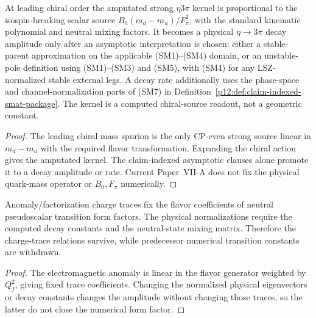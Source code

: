 \documentclass[12pt,a4paper]{article}
\begin{document}
\begin{corollary}
\label{p11:cor:native-eta-to-three-pi-source}

At leading chiral order the amputated strong \(\eta3\pi\) kernel is
proportional to the isospin-breaking scalar source
\(B_0(m_d-m_u)/F_\pi^2\), with the standard kinematic polynomial and neutral
mixing factors.  It becomes a physical \(\eta\to3\pi\) decay amplitude only
after an asymptotic interpretation is chosen: either a stable-parent
approximation on the applicable \textnormal{(SM1)--(SM4)} domain, or an
unstable-pole definition using \textnormal{(SM1)--(SM3)} and
\textnormal{(SM5)}, with \textnormal{(SM4)} for any LSZ-normalized stable
external legs.  A decay rate additionally uses the phase-space and
channel-normalization parts of \textnormal{(SM7)} in
Definition~\ref{p12:def:claim-indexed-smat-package}.
The kernel is a computed chiral-source readout, not a geometric constant.
\label{p11:eq:native-eta3pi-source}
\label{p11:eq:native-eta3pi-amplitude}
\end{corollary}
\begin{proof}

The leading chiral mass spurion is the only CP-even strong source linear in
\(m_d-m_u\) with the required flavor transformation.  Expanding the chiral
action gives the amputated kernel.  The claim-indexed asymptotic clauses alone
promote it to a decay amplitude or rate.  Current Paper~VII-A does not fix the
physical quark-mass operator or \(B_0,F_\pi\) numerically.
\end{proof}

\begin{corollary}
\label{p11:cor:native-neutral-transition-ff}

Anomaly/factorization charge traces fix the flavor coefficients of neutral pseudoscalar transition form factors.  The physical normalizations require the computed decay constants and the neutral-state mixing matrix.  Therefore the charge-trace relations survive, while predecessor numerical transition constants are withdrawn.
\label{p11:eq:native-neutral-charge-coeff}
\label{p11:eq:native-transition-ff-asymptotics}
\end{corollary}
\begin{proof}

The electromagnetic anomaly is linear in the flavor generator weighted by \(Q_f^2\), giving fixed trace coefficients.  Changing the normalized physical eigenvectors or decay constants changes the amplitude without changing those traces, so the latter do not close the numerical form factor.
\end{proof}
\end{document}
